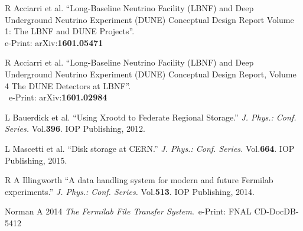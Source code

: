 \documentclass{PoS}
\begin{document}
\begin{thebibliography}{99}



R Acciarri et al.
``Long-Baseline Neutrino Facility (LBNF) and Deep Underground Neutrino Experiment (DUNE) Conceptual Design Report Volume 1: The LBNF and DUNE Projects''.\\ e-Print: arXiv:\textbf{1601.05471}

R Acciarri et al.
``Long-Baseline Neutrino Facility (LBNF) and Deep Underground Neutrino Experiment (DUNE) Conceptual Design Report, Volume 4 The DUNE Detectors at LBNF''.\\~e-Print: arXiv:\textbf{1601.02984}


L Bauerdick et al. ``Using Xrootd to Federate Regional Storage.'' \textit{J. Phys.: Conf. Series.} Vol.\textbf{396}. IOP Publishing, 2012.



 L Mascetti et al. ``Disk storage at CERN.'' \textit{J. Phys.: Conf. Series.} Vol.\textbf{664}. IOP Publishing, 2015.



R A Illingworth ``A data handling system for modern and future Fermilab experiments.''  \textit{J. Phys.: Conf. Series.} Vol.\textbf{513}. IOP Publishing, 2014.


Norman A 2014 \textit{The Fermilab File Transfer System}.~e-Print: FNAL CD-DocDB-5412


\end{thebibliography}
\end{document}
